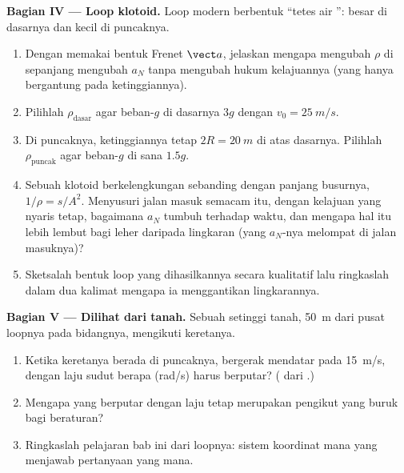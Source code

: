 \begin{problem}
\medskip
\noindent\textbf{Bagian IV --- Loop klotoid.}
Loop modern berbentuk ``tetes air '': 
besar di dasarnya dan kecil di puncaknya.
\begin{enumerate}[resume]
  \item Dengan memakai bentuk Frenet $\vect a$, jelaskan mengapa
        mengubah $\rho$ di sepanjang  mengubah $a_N$ tanpa
        mengubah hukum kelajuannya (yang hanya bergantung pada
        ketinggiannya).
  \item Pilihlah $\rho_{\text{dasar}}$ agar beban-$g$ di dasarnya $3g$
        dengan $v_0 = \qty{25}{m/s}$.
  \item Di puncaknya, ketinggiannya tetap $2R = \qty{20}{m}$ di atas
        dasarnya. Pilihlah $\rho_{\text{puncak}}$ agar beban-$g$ di sana
        $1.5g$.
  \item Sebuah klotoid berkelengkungan sebanding dengan panjang
        busurnya, $1/\rho = s/A^2$. Menyusuri jalan masuk semacam itu,
        dengan kelajuan yang nyaris tetap, bagaimana $a_N$ tumbuh
        terhadap waktu, dan mengapa hal itu lebih lembut bagi leher
        daripada lingkaran (yang $a_N$-nya melompat di jalan masuknya)?
  \item Sketsalah bentuk loop yang dihasilkannya secara kualitatif lalu
        ringkaslah dalam dua kalimat mengapa ia menggantikan lingkarannya.
\end{enumerate}

\medskip
\noindent\textbf{Bagian V --- Dilihat dari tanah.}
Sebuah  setinggi tanah, \qty{50}{m} dari pusat loopnya pada
bidangnya, mengikuti keretanya.
\begin{enumerate}[resume]
  \item Ketika keretanya berada di puncaknya, bergerak mendatar pada
        \qty{15}{m/s}, dengan laju sudut berapa (rad/s)  harus
        berputar? ( dari .)
  \item Mengapa  yang berputar dengan laju tetap merupakan
        pengikut yang buruk bagi  beraturan?
  \item Ringkaslah pelajaran bab ini dari loopnya: sistem koordinat mana
        yang menjawab pertanyaan yang mana.
\end{enumerate}
\end{problem}
